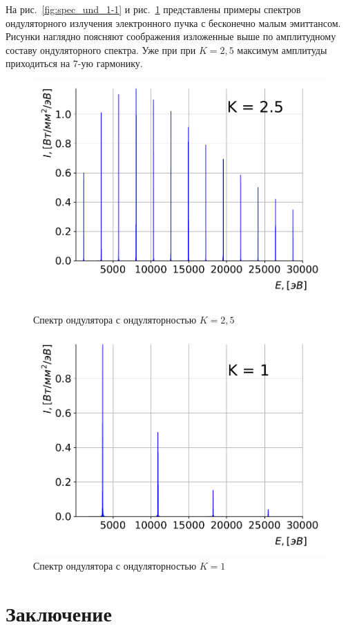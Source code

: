 На рис.~\ref{fig:spec_und_1-1} и рис.~\ref{fig:spec_und_1-2} представлены примеры спектров ондуляторного излучения электронного пучка с бесконечно малым эмиттансом. Рисунки наглядно поясняют соображения изложенные выше по амплитудному составу ондуляторного спектра. Уже при при $K = 2,5$ максимум амплитуды приходиться на $7$-ую гармонику.
\begin{figure}[ht!]
	\begin{minipage}{0.49\textwidth}
		\centering
		\includegraphics[width=\textwidth]{pic/spec_und_1-1.pdf}
		\caption{Спектр ондулятора с ондуляторностью $K = 2,5$}
		\label{fig:spec_und_1-1}
	\end{minipage}
	\begin{minipage}{0.49\textwidth}
		\centering
		\includegraphics[width=\textwidth]{pic/spec_und_1-2.pdf}
		\caption{Спектр ондулятора с ондуляторностью $K = 1$}
		\label{fig:spec_und_1-2}
	\end{minipage}    
\end{figure}

\section{Заключение}









